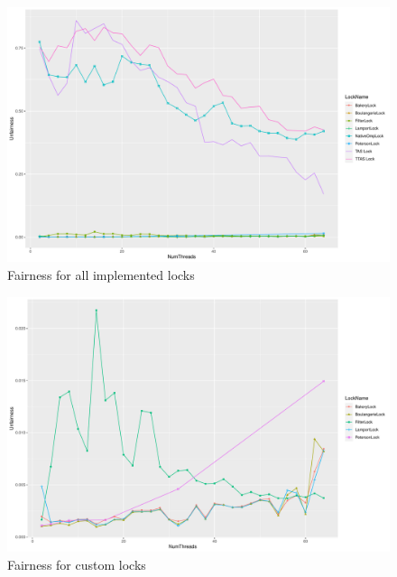 \begin{figure}[H]
  \includegraphics[width=\textwidth]{fig/fairness_all}
  \caption{Fairness for all implemented locks}
  \label{fig:fairness-all}
\end{figure}

\begin{figure}[H]
  \includegraphics[width=\textwidth]{fig/fairness_no_tas}
  \caption{Fairness for custom locks}
  \label{fig:fairness-no-tas}
\end{figure}
